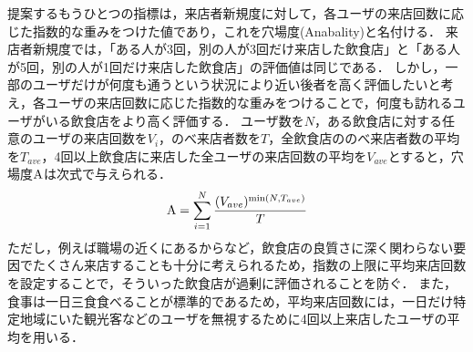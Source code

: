 提案するもうひとつの指標は，来店者新規度に対して，各ユーザの来店回数に応じた指数的な重みをつけた値であり，これを穴場度(Anabality)と名付ける．
来店者新規度では，「ある人が3回，別の人が3回だけ来店した飲食店」と「ある人が5回，別の人が1回だけ来店した飲食店」の評価値は同じである．
しかし，一部のユーザだけが何度も通うという状況により近い後者を高く評価したいと考え，各ユーザの来店回数に応じた指数的な重みをつけることで，何度も訪れるユーザがいる飲食店をより高く評価する．
ユーザ数を$N$，ある飲食店に対する任意のユーザの来店回数を$V_i$，のべ来店者数を$T$，全飲食店ののべ来店者数の平均を$T_{ave}$，4回以上飲食店に来店した全ユーザの来店回数の平均を$V_{ave}$とすると，穴場度$\rm A$は次式で与えられる．
\begin{equation}
	{\rm A} = \sum^{N}_{i=1} \frac{(V_{ave})^{{\rm min}(N,T_{ave})}}{T}
\end{equation}
ただし，例えば職場の近くにあるからなど，飲食店の良質さに深く関わらない要因でたくさん来店することも十分に考えられるため，指数の上限に平均来店回数を設定することで，そういった飲食店が過剰に評価されることを防ぐ．
また，食事は一日三食食べることが標準的であるため，平均来店回数には，一日だけ特定地域にいた観光客などのユーザを無視するために4回以上来店したユーザの平均を用いる．
